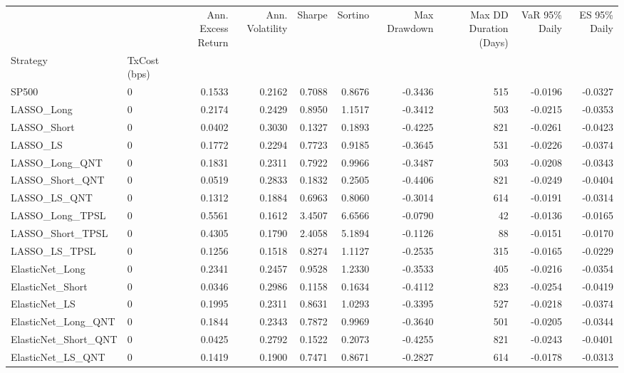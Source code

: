 \begin{tabular}{llrrrrrrrr}
\toprule
 &  & Ann. Excess Return & Ann. Volatility & Sharpe & Sortino & Max Drawdown & Max DD Duration (Days) & VaR 95\% Daily & ES 95\% Daily \\
Strategy & TxCost (bps) &  &  &  &  &  &  &  &  \\
\midrule
SP500 & 0 & 0.1533 & 0.2162 & 0.7088 & 0.8676 & -0.3436 & 515 & -0.0196 & -0.0327 \\
\cline{1-10}
LASSO\_Long & 0 & 0.2174 & 0.2429 & 0.8950 & 1.1517 & -0.3412 & 503 & -0.0215 & -0.0353 \\
\cline{1-10}
LASSO\_Short & 0 & 0.0402 & 0.3030 & 0.1327 & 0.1893 & -0.4225 & 821 & -0.0261 & -0.0423 \\
\cline{1-10}
LASSO\_LS & 0 & 0.1772 & 0.2294 & 0.7723 & 0.9185 & -0.3645 & 531 & -0.0226 & -0.0374 \\
\cline{1-10}
LASSO\_Long\_QNT & 0 & 0.1831 & 0.2311 & 0.7922 & 0.9966 & -0.3487 & 503 & -0.0208 & -0.0343 \\
\cline{1-10}
LASSO\_Short\_QNT & 0 & 0.0519 & 0.2833 & 0.1832 & 0.2505 & -0.4406 & 821 & -0.0249 & -0.0404 \\
\cline{1-10}
LASSO\_LS\_QNT & 0 & 0.1312 & 0.1884 & 0.6963 & 0.8060 & -0.3014 & 614 & -0.0191 & -0.0314 \\
\cline{1-10}
LASSO\_Long\_TPSL & 0 & 0.5561 & 0.1612 & 3.4507 & 6.6566 & -0.0790 & 42 & -0.0136 & -0.0165 \\
\cline{1-10}
LASSO\_Short\_TPSL & 0 & 0.4305 & 0.1790 & 2.4058 & 5.1894 & -0.1126 & 88 & -0.0151 & -0.0170 \\
\cline{1-10}
LASSO\_LS\_TPSL & 0 & 0.1256 & 0.1518 & 0.8274 & 1.1127 & -0.2535 & 315 & -0.0165 & -0.0229 \\
\cline{1-10}
ElasticNet\_Long & 0 & 0.2341 & 0.2457 & 0.9528 & 1.2330 & -0.3533 & 405 & -0.0216 & -0.0354 \\
\cline{1-10}
ElasticNet\_Short & 0 & 0.0346 & 0.2986 & 0.1158 & 0.1634 & -0.4112 & 823 & -0.0254 & -0.0419 \\
\cline{1-10}
ElasticNet\_LS & 0 & 0.1995 & 0.2311 & 0.8631 & 1.0293 & -0.3395 & 527 & -0.0218 & -0.0374 \\
\cline{1-10}
ElasticNet\_Long\_QNT & 0 & 0.1844 & 0.2343 & 0.7872 & 0.9969 & -0.3640 & 501 & -0.0205 & -0.0344 \\
\cline{1-10}
ElasticNet\_Short\_QNT & 0 & 0.0425 & 0.2792 & 0.1522 & 0.2073 & -0.4255 & 821 & -0.0243 & -0.0401 \\
\cline{1-10}
ElasticNet\_LS\_QNT & 0 & 0.1419 & 0.1900 & 0.7471 & 0.8671 & -0.2827 & 614 & -0.0178 & -0.0313 \\

\end{tabular}
